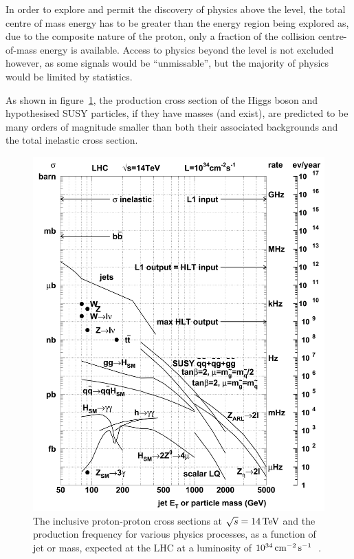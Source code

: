 In order to explore and permit the discovery of physics above the \TeV level, the total centre of mass energy has to be greater than the energy region being explored as, due to the composite nature of the proton, only a fraction of the collision centre-of-mass energy is available.
Access to physics beyond the \TeV level is not excluded	however, as some signals would be ``unmissable'', but the majority of physics would be limited by statistics.

As shown in figure~\ref{fig:crossSections}, the production cross section of the Higgs boson and hypothesised SUSY particles, if they have \TeV masses (and exist), are predicted to be many orders of magnitude smaller than both their associated backgrounds and  the total inelastic cross section.

\begin{figure}[htbp]
\begin{center}
\includegraphics[width=\textwidth]{figs/cms/crossSections.pdf}
\caption{The inclusive proton-proton cross sections at $\sqrt{s} = 14\,\text{Te\hspace{-.08em}V}$ and the production frequency for various physics processes, as a function of jet \ET or mass, expected at the LHC at a luminosity of $10^{34}\,\text{cm}^\text{$-$2}\,\text{s}^\text{$-$1}$~\cite{Dasu:2000ge}.}
\label{fig:crossSections}
\end{center}
\end{figure}


